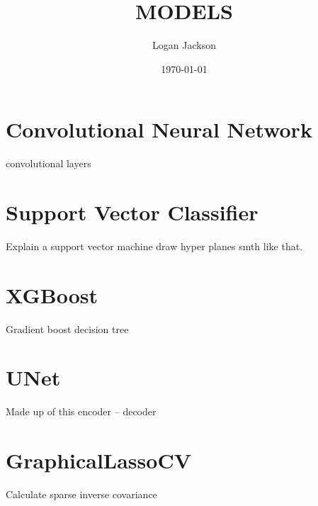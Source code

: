 \documentclass[11pt]{article}
\author{Logan Jackson}
\date{\today}
\title{MODELS}
\begin{document}
\maketitle
\tableofcontents


\section{Convolutional Neural Network}
\label{sec:orga5d4466}
convolutional layers
\section{Support Vector Classifier}
\label{sec:org865e234}
Explain a support vector machine draw hyper planes smth like that.
\section{XGBoost}
\label{sec:org2c1e511}
Gradient boost decision tree
\section{UNet}
\label{sec:org88850ee}
Made up of this encoder -- decoder
\section{GraphicalLassoCV}
\label{sec:org12bbf2c}
Calculate sparse inverse covariance
\end{document}
